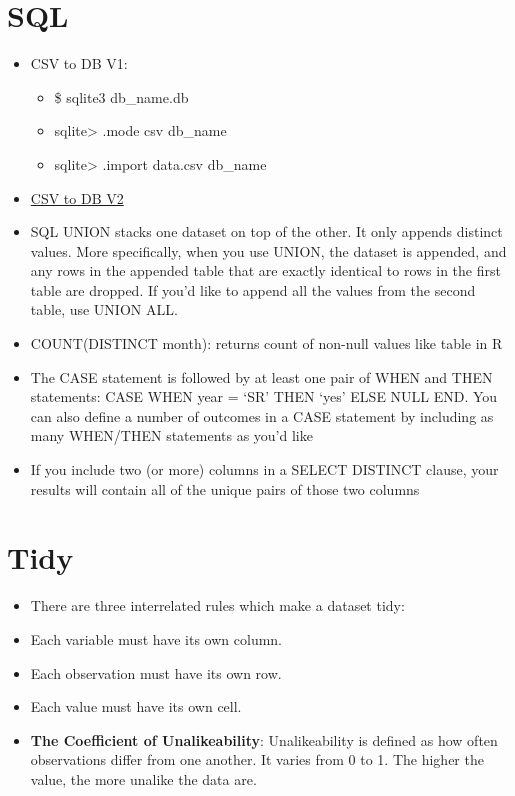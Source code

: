 \documentclass[]{book}
\providecommand{\tightlist}{%
  \setlength{\itemsep}{0pt}\setlength{\parskip}{0pt}}
\theoremstyle{definition}
\theoremstyle{definition}
\theoremstyle{definition}
\theoremstyle{remark}
\begin{document}
\section{SQL}\label{sql}

\begin{itemize}
\item
  CSV to DB V1:

  \begin{itemize}
  \tightlist
  \item
    \$ sqlite3 db\_name.db
  \item
    sqlite\textgreater{} .mode csv db\_name
  \item
    sqlite\textgreater{} .import data.csv db\_name
  \end{itemize}
\item
  \href{https://gist.github.com/gfleetwood/c2ea91da4a8ab1a77f777e28e0b2949c}{CSV
  to DB V2}
\item
  SQL UNION stacks one dataset on top of the other. It only appends
  distinct values. More specifically, when you use UNION, the dataset is
  appended, and any rows in the appended table that are exactly
  identical to rows in the first table are dropped. If you'd like to
  append all the values from the second table, use UNION ALL.
\item
  COUNT(DISTINCT month): returns count of non-null values like table in
  R
\item
  The CASE statement is followed by at least one pair of WHEN and THEN
  statements: CASE WHEN year = `SR' THEN `yes' ELSE NULL END. You can
  also define a number of outcomes in a CASE statement by including as
  many WHEN/THEN statements as you'd like
\item
  If you include two (or more) columns in a SELECT DISTINCT clause, your
  results will contain all of the unique pairs of those two columns
\end{itemize}

\section{Tidy}\label{tidy-1}

\begin{itemize}
\item
  There are three interrelated rules which make a dataset tidy:
\item
  Each variable must have its own column.
\item
  Each observation must have its own row.
\item
  Each value must have its own cell.
\item
  \textbf{The Coefficient of Unalikeability}: Unalikeability is defined
  as how often observations differ from one another. It varies from 0 to
  1. The higher the value, the more unalike the data are.
\end{itemize}
\end{document}
